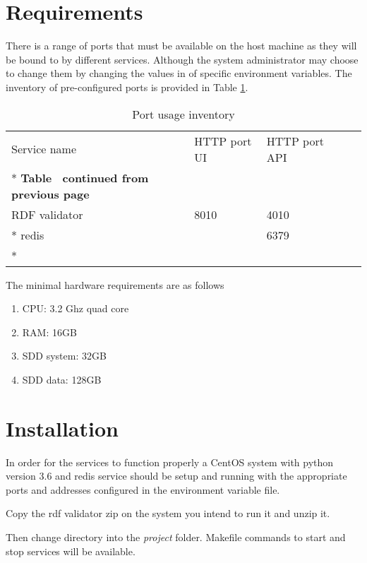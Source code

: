 \section{Requirements}
\label{sec:requirements}
There is a range of ports that must be available on the host machine as they will be bound to by different services. Although the system administrator may choose to change them by changing the values in of specific environment variables. The inventory of pre-configured ports is provided in Table \ref{tab:validator-port-inventory}.

\begin{longtable}[c]{@{}p{3.64cm}p{1.25cm}p{1.25cm}p{1.9cm}p{5cm}@{}}
	\toprule
	Service name  & HTTP port UI & HTTP port API                \\* \midrule
	\endfirsthead
	\multicolumn{5}{c}%
	{{\bfseries Table \thetable\ continued from previous page}} \\
	\endhead
	\bottomrule
	\endfoot
	\endlastfoot
	RDF validator & 8010         & 4010                         \\* \hline
	redis         &              & 6379                         \\* \bottomrule
	\caption{Port usage inventory}
	\label{tab:validator-port-inventory}                        \\
\end{longtable}

The minimal hardware requirements are as follows 
\begin{enumerate}
	\item CPU: 3.2 Ghz quad core
	\item RAM: 16GB
	\item SDD system: 32GB
	\item SDD data: 128GB
\end{enumerate}

\section{Installation}
\label{sec:installation}
In order for the services to function properly a CentOS system with python version 3.6  and redis service should be setup and running with the appropriate ports and addresses configured in the environment variable file. 

Copy the rdf validator zip on the system you intend to run it and unzip it.

Then change directory into the \textit{project} folder. Makefile commands to start and stop services will be available. 	

